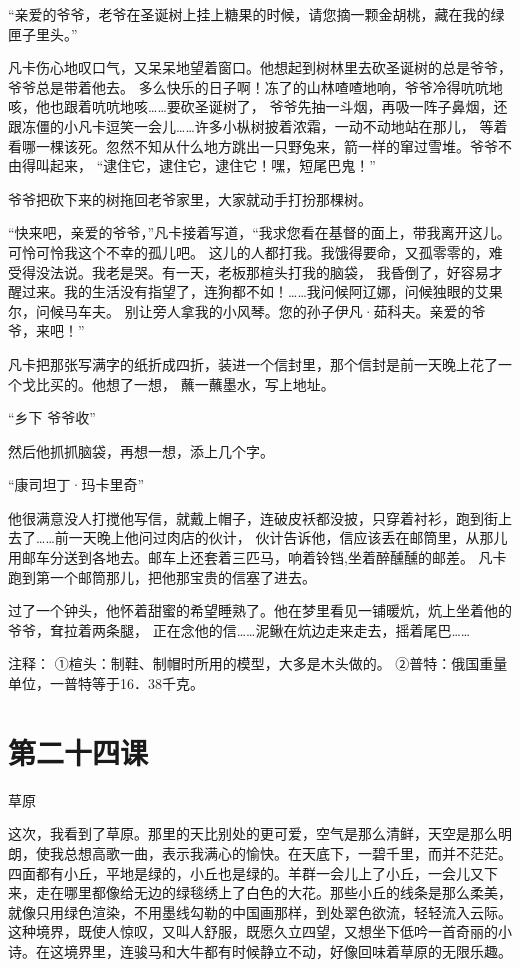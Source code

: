 \documentclass[12pt,UTF8]{ctexbook}
\begin{document}
“亲爱的爷爷，老爷在圣诞树上挂上糖果的时候，请您摘一颗金胡桃，藏在我的绿匣子里头。”

凡卡伤心地叹口气，又呆呆地望着窗口。他想起到树林里去砍圣诞树的总是爷爷，爷爷总是带着他去。
多么快乐的日子啊！冻了的山林喳喳地响，爷爷冷得吭吭地咳，他也跟着吭吭地咳……要砍圣诞树了，
爷爷先抽一斗烟，再吸一阵子鼻烟，还跟冻僵的小凡卡逗笑一会儿……许多小枞树披着浓霜，一动不动地站在那儿，
等着看哪一棵该死。忽然不知从什么地方跳出一只野兔来，箭一样的窜过雪堆。爷爷不由得叫起来，
“逮住它，逮住它，逮住它！嘿，短尾巴鬼！”

爷爷把砍下来的树拖回老爷家里，大家就动手打扮那棵树。

“快来吧，亲爱的爷爷，”凡卡接着写道，“我求您看在基督的面上，带我离开这儿。可怜可怜我这个不幸的孤儿吧。
这儿的人都打我。我饿得要命，又孤零零的，难受得没法说。我老是哭。有一天，老板那楦头打我的脑袋，
我昏倒了，好容易才醒过来。我的生活没有指望了，连狗都不如！……我问候阿辽娜，问候独眼的艾果尔，问候马车夫。
别让旁人拿我的小风琴。您的孙子伊凡·茹科夫。亲爱的爷爷，来吧！”

凡卡把那张写满字的纸折成四折，装进一个信封里，那个信封是前一天晚上花了一个戈比买的。他想了一想，
蘸一蘸墨水，写上地址。

“乡下 爷爷收”

然后他抓抓脑袋，再想一想，添上几个字。

“康司坦丁·玛卡里奇”

他很满意没人打搅他写信，就戴上帽子，连破皮袄都没披，只穿着衬衫，跑到街上去了……前一天晚上他问过肉店的伙计，
伙计告诉他，信应该丢在邮筒里，从那儿用邮车分送到各地去。邮车上还套着三匹马，响着铃铛,坐着醉醺醺的邮差。
凡卡跑到第一个邮筒那儿，把他那宝贵的信塞了进去。

过了一个钟头，他怀着甜蜜的希望睡熟了。他在梦里看见一铺暖炕，炕上坐着他的爷爷，耷拉着两条腿，
正在念他的信……泥鳅在炕边走来走去，摇着尾巴……

注释：
①楦头：制鞋、制帽时所用的模型，大多是木头做的。
②普特：俄国重量单位，一普特等于16．38千克。

\section{第二十四课}

草原

这次，我看到了草原。那里的天比别处的更可爱，空气是那么清鲜，天空是那么明朗，使我总想高歌一曲，表示我满心的愉快。在天底下，一碧千里，而并不茫茫。四面都有小丘，平地是绿的，小丘也是绿的。羊群一会儿上了小丘，一会儿又下来，走在哪里都像给无边的绿毯绣上了白色的大花。那些小丘的线条是那么柔美，就像只用绿色渲染，不用墨线勾勒的中国画那样，到处翠色欲流，轻轻流入云际。这种境界，既使人惊叹，又叫人舒服，既愿久立四望，又想坐下低吟一首奇丽的小诗。在这境界里，连骏马和大牛都有时候静立不动，好像回味着草原的无限乐趣。
\end{document}
